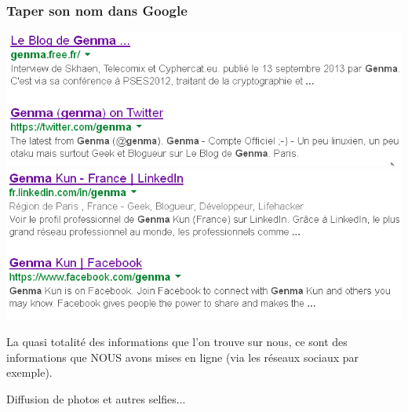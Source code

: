 \documentclass{beamer}
\begin{document}
\begin{frame}
\frametitle{Taper son nom dans Google}
\begin{center}
\includegraphics[scale=0.5] {./images/Google01.png} 
\includegraphics[scale=0.5] {./images/Google02.png} 
\end{center}
\end{frame}
\begin{frame}
\huge{
La quasi totalité des informations que l'on trouve sur nous, ce sont des informations que NOUS avons mises en ligne (via les réseaux sociaux par exemple).}
\end{frame}

{
\begin{frame}
\begin{center}
\Huge{Diffusion de photos et autres selfies...}
\end{center}
\end{frame}
}
\end{document}
